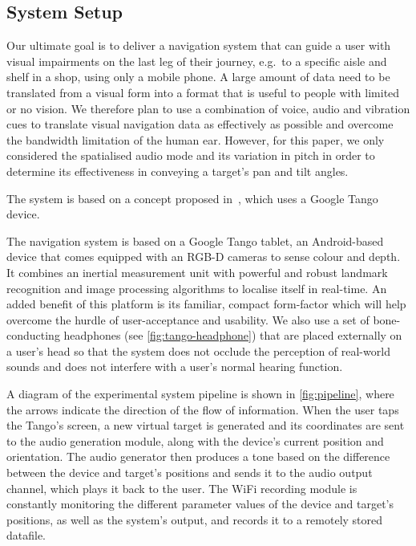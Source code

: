 \documentclass[sigconf, screen=true, anonymous=true]{acmart}
\begin{document}
\subsection{System Setup}

Our ultimate goal is to deliver a navigation system that can guide a user with visual impairments on the last leg of their journey, e.g.\ to a specific aisle and shelf in a shop, using only a mobile phone.
A large amount of data need to be translated from a visual form into a format that is useful to people with limited or no vision.
We therefore plan to use a combination of voice, audio and vibration cues to translate visual navigation data as effectively as possible and overcome the bandwidth limitation of the human ear. 
However, for this paper, we only considered the spatialised audio mode and its variation in pitch in order to determine its effectiveness in conveying a target's pan and tilt angles.

\begin{anonsuppress}
The system is based on a concept proposed in~\cite{bellotto2013, lock2017portable}, which uses a Google Tango device.
\end{anonsuppress}
The navigation system is based on a Google Tango tablet, an Android-based device that comes equipped with an RGB-D cameras to sense colour and depth.
It combines an inertial measurement unit with powerful and robust landmark recognition and image processing algorithms to localise itself in real-time.
An added benefit of this platform is its familiar, compact form-factor which will help overcome the hurdle of user-acceptance and usability.
We also use a set of bone-conducting headphones (see \cref{fig:tango-headphone}) that are placed externally on a user's head so that the system does not occlude the perception of real-world sounds and does not interfere with a user's normal hearing function.

A diagram of the experimental system pipeline is shown in \cref{fig:pipeline}, where the arrows indicate the direction of the flow of information.
When the user taps the Tango's screen, a new virtual target is generated and its coordinates are sent to the audio generation module, along with the device's current position and orientation.
The audio generator then produces a tone based on the difference between the device and target's positions and sends it to the audio output channel, which plays it back to the user.
The WiFi recording module is constantly monitoring the different parameter values of the device and target's positions, as well as the system's output, and records it to a remotely stored datafile. 
\end{document}
